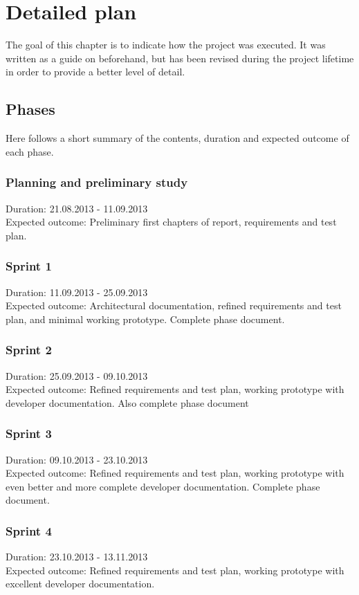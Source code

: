 \documentclass[11pt]{book}
\begin{document}
\section{Detailed plan}
The goal of this chapter is to indicate how the project was executed. It was written as a guide on beforehand, but has been revised during the project lifetime in order to provide a better level of detail.

\subsection{Phases}\label{subsec:phases}
Here follows a short summary of the contents, duration and expected outcome of each phase.

\subsubsection{Planning and preliminary study}
Duration: 21.08.2013 - 11.09.2013\\
Expected outcome: Preliminary first chapters of report, requirements and test plan.

\subsubsection{Sprint 1}
Duration: 11.09.2013 - 25.09.2013\\
Expected outcome: Architectural documentation, refined requirements and test plan, and minimal working prototype. Complete phase document.

\subsubsection{Sprint 2}
Duration: 25.09.2013 - 09.10.2013\\
Expected outcome: Refined requirements and test plan, working prototype with developer documentation. Also complete phase document

\subsubsection{Sprint 3}
Duration: 09.10.2013 - 23.10.2013\\
Expected outcome: Refined requirements and test plan, working prototype with even better and more complete developer documentation. Complete phase document.

\subsubsection{Sprint 4}
Duration: 23.10.2013 - 13.11.2013\\
Expected outcome: Refined requirements and test plan, working prototype with excellent developer documentation.
\end{document}
